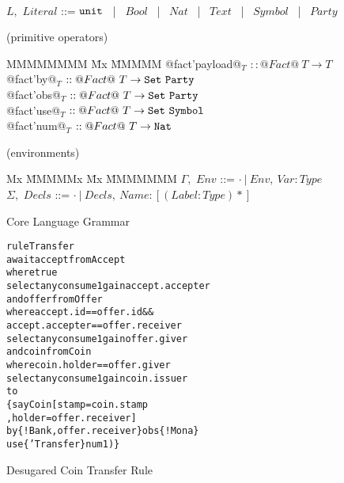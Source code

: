 \begin{figure}
\begin{tabbing}
\\[1ex]
  $L,$   \> $Literal$   \> ::= \> $\texttt{unit}$ ~|~ $Bool$ ~|~ $Nat$ ~|~ $Text$ ~|~ $Symbol$ ~|~ $Party$
\end{tabbing}

\medskip
\begin{flushleft}
(primitive operators)
\end{flushleft}
\begin{tabbing}
MMMMMMMM \= Mx \= MMMMM \kill
   @fact'payload@$_T$ \> $:: @Fact@~ T \to T$
\\ @fact'by@$_T$      \> $:: @Fact@~ T \to \texttt{Set}~ \texttt{Party}$
\\ @fact'obs@$_T$     \> $:: @Fact@~ T \to \texttt{Set}~ \texttt{Party}$
\\ @fact'use@$_T$     \> $:: @Fact@~ T \to \texttt{Set}~ \texttt{Symbol}$
\\ @fact'num@$_T$     \> $:: @Fact@~ T \to \texttt{Nat}$
\end{tabbing}

\medskip
\begin{flushleft}
(environments)
\begin{tabbing}
Mx              \= MMMMMx       \= Mx \= MMMMMMM \kill
   $\Gamma,$       \> $Env$     \> ::= \> $\cdot ~|~ Env,~ Var : Type$
\\ $\Sigma,$       \> $Decls$   \> ::= \> $\cdot ~|~ Decls,~ Name : [(Label : Type)*]$
\end{tabbing}
\end{flushleft}

\caption{Core Language Grammar}
\label{f:Grammar}
\end{figure}



\begin{figure}
\begin{small}
\begin{alltt}
rule  Transfer
await accept from Accept
       where true
       select any  consume 1 gain accept.accepter
 and  offer  from Offer
       where accept.id       == offer.id  &&
             accept.accepter == offer.receiver
       select any  consume 1 gain offer.giver
 and  coin   from Coin
       where coin.holder == offer.giver
       select any  consume 1 gain coin.issuer
to
    \{ say Coin [ stamp  = coin.stamp
               , holder = offer.receiver]
       by  \{ !Bank, offer.receiver \}  obs \{ !Mona \}
       use \{ 'Transfer \}              num 1) \}
\end{alltt}
\end{small}

\caption{Desugared Coin Transfer Rule}
\label{f:CoinTransferDesugared}
\end{figure}



